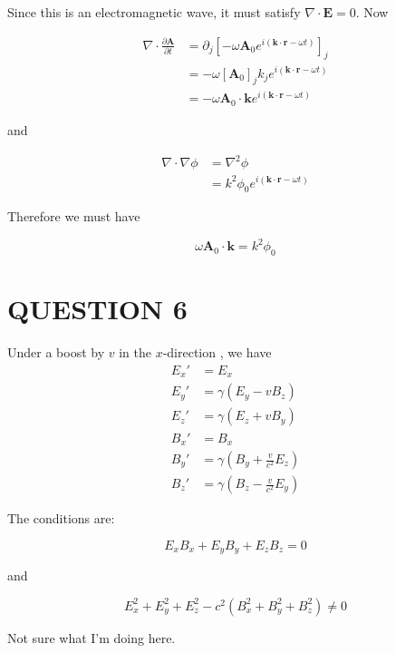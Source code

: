 \documentclass[a4paper]{article}
\begin{document}
Since this is an electromagnetic wave, it must satisfy $ \nabla  \cdot \mathbf{E} = 0 $. Now

\begin{align*}
\nabla  \cdot \frac{\partial \mathbf{A} }{\partial t} & = \partial_{j} [ - \omega \mathbf{A}_{0} e^{i(\mathbf{k} \cdot \mathbf{r} - \omega t )} ]_{j}  \\
& = - \omega [\mathbf{A}_{0}]_{j} k_{j} e^{i(\mathbf{k} \cdot \mathbf{r} - \omega t )} \\
& = - \omega \mathbf{A}_{0} \cdot \mathbf{k} e^{i(\mathbf{k} \cdot \mathbf{r} - \omega t )}
\end{align*}

and

\begin{align*}
\nabla  \cdot \nabla  \phi & = \nabla^{2} \phi \\
& = k^{2} \phi_{0} e^{i(\mathbf{k} \cdot \mathbf{r} - \omega t)}
\end{align*}

Therefore we must have

\[ \omega \mathbf{A}_{0} \cdot \mathbf{k} = k^{2} \phi_{0} \]







\section{QUESTION 6}

Under a boost by $v$ in the $x$-direction , we have
\begin{align*}
E_x' &= E_x\\
E_y' &= \gamma(E_y - vB_z)\\
E_z' &= \gamma(E_z + vB_y)\\
B_x' &= B_x\\
B_y' &= \gamma\left(B_y + \frac{v}{c^2}E_z\right)\\
B_z' &= \gamma\left(B_z - \frac{v}{c^2} E_y\right)
\end{align*}

The conditions are:

\[ E_{x} B_{x} + E_{y} B_{y} + E_{z} B_{z} = 0 \]

and

\[ E_{x}^{2} + E_{y}^{2}+ E_{z}^{2} - c^{2} \left( B_{x}^{2} + B_{y}^{2} + B_{z}^{2}  \right) \neq 0  \]

Not sure what I'm doing here.
\end{document}
